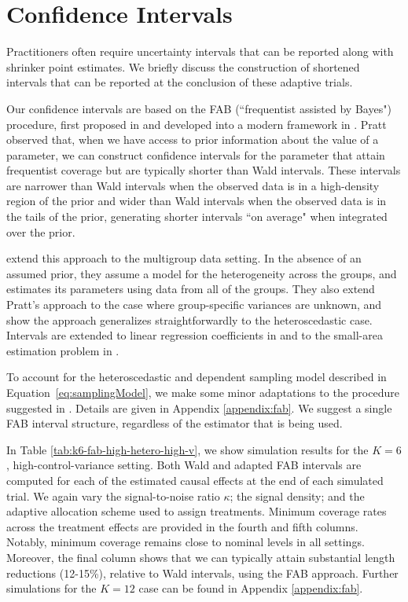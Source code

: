 \documentclass{article}
\begin{document}
\section{Confidence Intervals}\label{sec:cis}

Practitioners often require uncertainty intervals that can be reported along with shrinker point estimates. We briefly discuss the construction of shortened intervals that can be reported at the conclusion of these adaptive trials.

Our confidence intervals are based on the FAB (``frequentist assisted by Bayes") procedure, first proposed in \cite{pratt1963shorter} and developed into a modern framework in \cite{yu_hoff_2018}. 
Pratt observed that, when we have access to prior information about the value of a parameter, we can construct confidence intervals for the parameter that attain frequentist coverage but are typically shorter than Wald intervals. These intervals are narrower than Wald intervals when the observed data is in a high-density region of the prior and wider than Wald intervals when the observed data is in the tails of the prior, generating shorter intervals ``on average" when integrated over the prior.

\cite{yu_hoff_2018} extend this approach to the multigroup data setting. In the absence of an assumed prior, they assume a model for the heterogeneity across the groups, and estimates its parameters using data from all of the groups. They also extend Pratt's approach to the case where group-specific variances are unknown, and show the approach generalizes straightforwardly to the heteroscedastic case. Intervals are extended to linear regression coefficients in \cite{10.1214/18-EJS1517} and to the small-area estimation problem in \cite{10.1093/jssam/smz010}.

To account for the heteroscedastic and dependent sampling model described in Equation~\eqref{eq:samplingModel}, we make some minor adaptations to the procedure suggested in \cite{yu_hoff_2018}. Details are given in Appendix \ref{appendix:fab}. We suggest a single FAB interval structure, regardless of the estimator that is being used. 

In Table \ref{tab:k6-fab-high-hetero-high-v}, we show simulation results for the $K = 6$, high-control-variance setting. Both Wald and adapted FAB intervals are computed for each of the estimated causal effects at the end of each simulated trial. We again vary the signal-to-noise ratio $\kappa$; the signal density; and the adaptive allocation scheme used to assign treatments. Minimum coverage rates across the treatment effects are provided in the fourth and fifth columns. Notably, minimum coverage remains close to nominal levels in all settings. Moreover, the final column shows that we can typically attain substantial length reductions (12-15\%), relative to Wald intervals, using the FAB approach. Further simulations for the $K = 12$ case can be found in Appendix \ref{appendix:fab}. 
\end{document}
